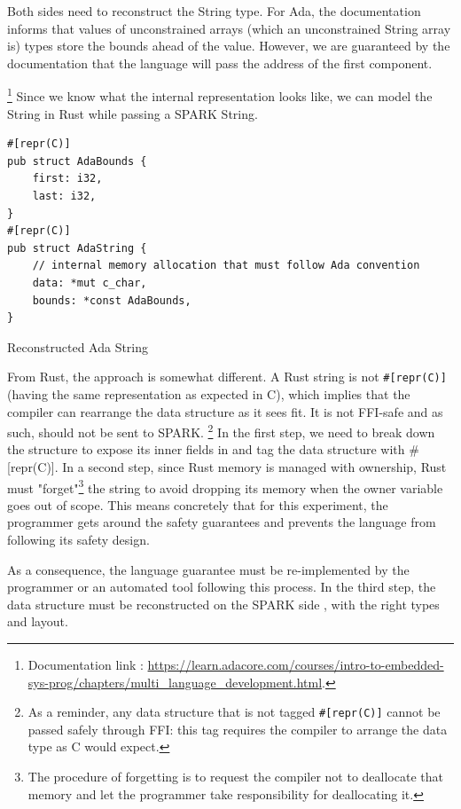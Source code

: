 \documentclass[nomenclature, english, bibtex]{kththesis}
\begin{document}
Both sides need to reconstruct the String type. For Ada, the documentation informs that values of unconstrained arrays (which an unconstrained String array is) types store the bounds ahead of the value. However, we are guaranteed by the documentation that the language will pass the address of the first component.{\footnote{Documentation link : \url{https://learn.adacore.com/courses/intro-to-embedded-sys-prog/chapters/multi\_language\_development.html}.} Since we know what the internal representation looks like, we can model the String in Rust while passing a SPARK String.

\begin{listing}[!ht]
\begin{verbatim}
#[repr(C)]
pub struct AdaBounds {
    first: i32,
    last: i32,
}
#[repr(C)]
pub struct AdaString {
    // internal memory allocation that must follow Ada convention
    data: *mut c_char,
    bounds: *const AdaBounds,
}
\end{verbatim}
\caption[Reconstructed Ada String]{Reconstructed Ada String}
\label{lst:reconstructed_ada_string}
\end{listing}


From Rust, the approach is somewhat different. A Rust string is not \texttt{\#[repr(C)]} (having the same representation as expected in C), which implies that the compiler can rearrange the data structure as it sees fit. It is not \gls{FFI}-safe and as such, should not be sent to SPARK. \footnote{As a reminder, any data structure that is not tagged \texttt{\#[repr(C)]} cannot be passed safely through FFI: this tag requires the compiler to arrange the data type as C would expect.} In the first step, we need to break down the structure to expose its inner fields in  and tag the data structure with \#[repr(C)]. In a second step, since Rust memory is managed with ownership, Rust must "forget"\footnote{The procedure of forgetting is to request the compiler not to deallocate that memory and let the programmer take responsibility for deallocating it.} the string to avoid dropping its memory when the owner variable goes out of scope. This means concretely that for this experiment, the programmer gets around the safety guarantees and prevents the language from following its safety design. 

As a consequence, the language guarantee must be re-implemented by the programmer or an automated tool following this process. 
In the third step, the data structure must be reconstructed on the SPARK side , with the right types and layout.


}
\end{document}
